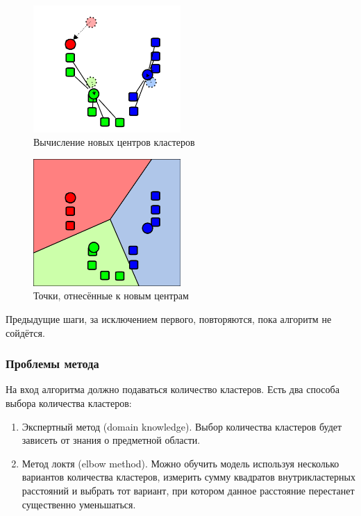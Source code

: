 \documentclass[bachelor, och, referat]{SCWorks}
\begin{document}
\begin{figure}[H]
    \centering
    \includegraphics[width=0.5\textwidth]{3.png}
    \caption{Вычисление новых центров кластеров}
\end{figure}

\begin{figure}[H]
    \centering
    \includegraphics[width=0.5\textwidth]{4.png}
    \caption{Точки, отнесённые к новым центрам}
\end{figure}

Предыдущие шаги, за исключением первого, повторяются, пока алгоритм не сойдётся.

\subsubsection{Проблемы метода}
На вход алгоритма должно подаваться количество кластеров.
Есть два способа выбора количества кластеров:
\begin{enumerate}
    \item Экспертный метод (domain knowledge). Выбор количества кластеров будет зависеть от знания о предметной области.
    \item Метод локтя (elbow method). Можно обучить модель используя несколько вариантов количества кластеров, измерить сумму квадратов внутрикластерных расстояний и выбрать тот вариант, при котором данное расстояние перестанет существенно уменьшаться.
\end{enumerate}
\end{document}
